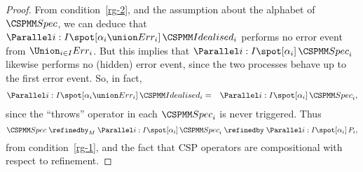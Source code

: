 \begin{proof}
From condition~\ref{rg-2}, and the assumption about the alphabet of~$\Spec$,
we can deduce that $\Parallel i:I \spot [\alpha_i \union Err_i] \,
\Idealised_i$ performs no error event from $\Union_{i \in I} Err_i$.  But this
implies that $\Parallel i:I \spot [\alpha_i] \, \Spec_i$ likewise
performs no (hidden) error event, since the two processes behave up to the
first error event.  So, in fact,
\begin{eqnarray*}
\Parallel i:I \spot [\alpha_i \union Err_i] \, \Idealised_i & = & 
  \Parallel i:I \spot [\alpha_i] \, \Spec_i,
\end{eqnarray*}
since the ``throws'' operator in each $\Spec_i$ is never triggered.  Thus
\[
\Spec  \;\refinedby_M\;    \Parallel i:I \spot [\alpha_i] \, \Spec_i 
  \;\refinedby\;  \Parallel i:I \spot [\alpha_i] \, P_i,
\]
from condition~\ref{rg-1}, and the fact that CSP operators are compositional
with respect to refinement.
\end{proof}






